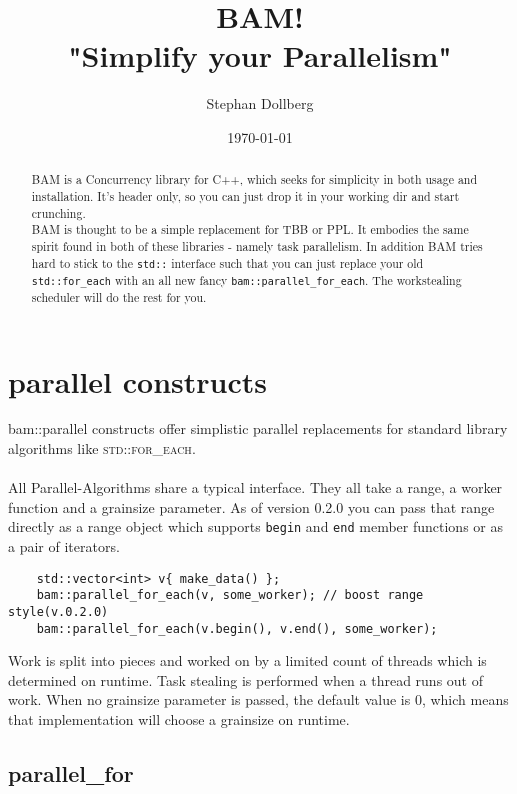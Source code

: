 \documentclass[11pt, a4paper]{article}
\begin{document}
\title{\bf\color{DarkOrchid}BAM!\\
\bf"Simplify your Parallelism"
 }
\author{Stephan Dollberg}
\date{\today}
\maketitle

\begin{abstract}
BAM is a Concurrency library for C++, which seeks for simplicity in both usage and installation. It's header only, so you can just drop it in your working dir and start crunching.\\
BAM is thought to be a simple replacement for TBB or PPL. It embodies the same spirit found in both of these libraries - namely task parallelism. In addition BAM tries hard to stick to the \texttt{std::} interface such that you can just replace your old \texttt{std::for\_each} with an all new fancy \texttt{bam::parallel\_for\_each}. The workstealing scheduler will do the rest for you. 
\end{abstract}

\tableofcontents

\section{parallel constructs}
bam::parallel constructs offer simplistic parallel replacements for standard library algorithms like \textsc{std::for\_each}.
\\\\All Parallel-Algorithms share a typical interface. They all take a range, a worker function and a grainsize parameter. As of version 0.2.0 you can pass that range directly as a range object which supports \texttt{begin} and \texttt{end} member functions or as a pair of iterators.

\begin{lstlisting}
    std::vector<int> v{ make_data() };
    bam::parallel_for_each(v, some_worker); // boost range style(v.0.2.0)
    bam::parallel_for_each(v.begin(), v.end(), some_worker);
\end{lstlisting}

Work is split into pieces and worked on by a limited count of threads which is determined on runtime. Task stealing is performed when a thread runs out of work. When no grainsize parameter is passed, the default value is 0, which means that implementation will choose a grainsize on runtime.

\subsection{parallel\_for}
\end{document}
